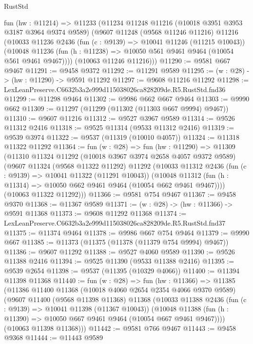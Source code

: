 \begin{lexlean}{RustStd}
\begin{coremodule}
  fun (hw : @11214) =>
  @11233
    (@11234
      @11248
      @11216
      (@10018 @3951 @3953 @3187 @3964 @9374 @9589)
      (@9607
        @11248
        (@9568 @11246 @11216)
        @11216
        (@10033
          @11236
          @2436
          (fun (c : @9139) => @10041 @11246 (@11215 @10043))
          (@10048 @11236 (fun (h : @11238) => @10050 @561 @9461 @9464 (@10054 @561 @9461 @9467))))
        (@10063 @11246 @11216)))
@11290 := @9581 @667 @9467
@11291 := @9458 @9372
@11292 := @11291 @9589
@11295 := (w : @28) -> (hw : @11290) -> @9591 @11292
@11297 := @9608 @11216 @11292
@11298 := LexLeanPreserve.C6632b3a2e999d115038026ca828209de.R5.RustStd.fnd36
@11299 := @11298 @9464
@11302 := @9986 @662 @667 @9464
@11303 := @9990 @662
@11309 := @11297 (@11299 (@11302 (@11303 @667 @9994) @9467))
@11310 := @9607 @11216
@11312 := @9527 @3967 @9589
@11314 := @9526 @11312 @2416
@11318 := @9525 @11314 (@9533 @11312 @2416)
@11319 := @9539 @3974
@11322 := @9537 (@11319 (@10010 @4057))
@11324 := @11318 @11322 @11292
@11364 := fun (w : @28) =>
  fun (hw : @11290) =>
  @11309
    (@11310
      @11324
      @11292
      (@10018 @3967 @3974 @2658 @4057 @9372 @9589)
      (@9607
        @11324
        (@9568 @11322 @11292)
        @11292
        (@10033
          @11312
          @2436
          (fun (c : @9139) => @10041 @11322 (@11291 @10043))
          (@10048 @11312 (fun (h : @11314) => @10050 @662 @9461 @9464 (@10054 @662 @9461 @9467))))
        (@10063 @11322 @11292)))
@11366 := @9581 @754 @9467
@11367 := @9458 @9370
@11368 := @11367 @9589
@11371 := (w : @28) -> (hw : @11366) -> @9591 @11368
@11373 := @9608 @11292 @11368
@11374 := LexLeanPreserve.C6632b3a2e999d115038026ca828209de.R5.RustStd.fnd37
@11375 := @11374 @9464
@11378 := @9986 @667 @754 @9464
@11379 := @9990 @667
@11385 := @11373 (@11375 (@11378 (@11379 @754 @9994) @9467))
@11386 := @9607 @11292
@11388 := @9527 @4060 @9589
@11390 := @9526 @11388 @2416
@11394 := @9525 @11390 (@9533 @11388 @2416)
@11395 := @9539 @2654
@11398 := @9537 (@11395 (@10329 @4066))
@11400 := @11394 @11398 @11368
@11440 := fun (w : @28) =>
  fun (hw : @11366) =>
  @11385
    (@11386
      @11400
      @11368
      (@10018 @4060 @2654 @2354 @4066 @9370 @9589)
      (@9607
        @11400
        (@9568 @11398 @11368)
        @11368
        (@10033
          @11388
          @2436
          (fun (c : @9139) => @10041 @11398 (@11367 @10043))
          (@10048 @11388 (fun (h : @11390) => @10050 @667 @9461 @9464 (@10054 @667 @9461 @9467))))
        (@10063 @11398 @11368)))
@11442 := @9581 @766 @9467
@11443 := @9458 @9368
@11444 := @11443 @9589

\end{coremodule}
\end{lexlean}
